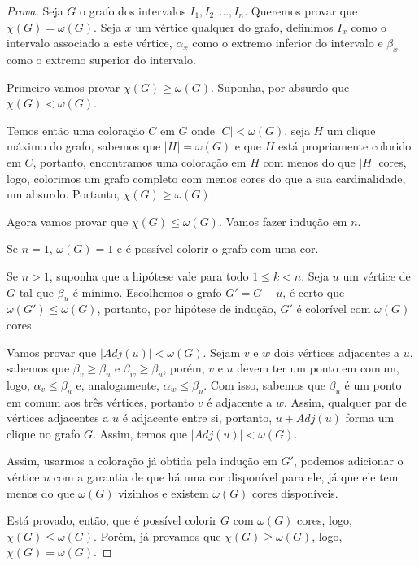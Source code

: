 \documentclass[12pt]{article}
\begin{document}
\begin{proof}[Prova]
Seja $G$ o grafo dos intervalos $I_1, I_2, \dots, I_n$. Queremos provar que $\chi(G) = \omega(G)$. Seja $x$ um vértice qualquer do grafo, definimos $I_x$ como o intervalo associado a este vértice, $\alpha_x$ como o extremo inferior do intervalo e $\beta_x$ como o extremo superior do intervalo.

Primeiro vamos provar $\chi(G) \geq \omega(G)$. Suponha, por absurdo que $\chi(G) < \omega(G)$.

Temos então uma coloração $C$ em $G$ onde $|C| < \omega(G)$, seja $H$ um clique máximo do grafo, sabemos que $|H| = \omega(G)$ e que $H$ está propriamente colorido em $C$, portanto, encontramos uma coloração em $H$ com menos do que $|H|$ cores, logo, colorimos um grafo completo com menos cores do que a sua cardinalidade, um absurdo. Portanto, $\chi(G) \geq \omega(G)$.

Agora vamos provar que $\chi(G) \leq \omega(G)$. Vamos fazer indução em $n$.

Se $n = 1$, $\omega(G) = 1$ e é possível colorir o grafo com uma cor.

Se $n > 1$, suponha que a hipótese vale para todo $1 \leq k < n$. Seja $u$ um vértice de $G$ tal que $\beta_u$ é mínimo. Escolhemos o grafo $G' = G - u$, é certo que $\omega(G') \leq \omega(G)$, portanto, por hipótese de indução, $G'$ é colorível com $\omega(G)$ cores.

Vamos provar que $|Adj(u)| < \omega(G)$. Sejam $v$ e $w$ dois vértices adjacentes a $u$, sabemos que $\beta_v \geq \beta_u$ e $\beta_w \geq \beta_u$, porém, $v$ e $u$ devem ter um ponto em comum, logo, $\alpha_v \leq \beta_u$ e, analogamente, $\alpha_w \leq \beta_u$. Com isso, sabemos que $\beta_u$ é um ponto em comum aos três vértices, portanto $v$ é adjacente a $w$. Assim, qualquer par de vértices adjacentes a $u$ é adjacente entre si, portanto, $u + Adj(u)$ forma um clique no grafo $G$. Assim, temos que $|Adj(u)| < \omega(G)$.

Assim, usarmos a coloração já obtida pela indução em $G'$, podemos adicionar o vértice $u$ com a garantia de que há uma cor disponível para ele, já que ele tem menos do que $\omega(G)$ vizinhos e existem $\omega(G)$ cores disponíveis.

Está provado, então, que é possível colorir $G$ com $\omega(G)$ cores, logo, $\chi(G) \leq \omega(G)$. Porém, já provamos que $\chi(G) \geq \omega(G)$, logo, $\chi(G) = \omega(G)$.
\end{proof}
\end{document}
